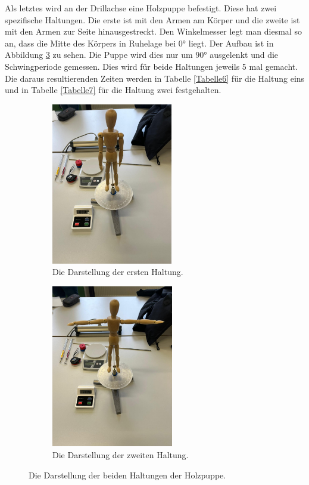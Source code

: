 \begin{flushleft}
    Als letztes wird an der Drillachse eine Holzpuppe befestigt. 
    Diese hat zwei spezifische Haltungen. 
    Die erste ist mit den Armen am Körper und die zweite ist mit den Armen zur Seite hinausgestreckt.
    Den Winkelmesser legt man diesmal so an, dass die Mitte des Körpers in Ruhelage bei $0 \unit{\degree}$ liegt.
    Der Aufbau ist in Abbildung \ref{Abbildung5} zu sehen.
    Die Puppe wird dies nur um $ 90 \unit{\degree} $ ausgelenkt und die Schwingperiode gemessen.
    Dies wird für beide Haltungen jeweils 5 mal gemacht.
    Die daraus resultierenden Zeiten werden in Tabelle \ref{Tabelle6} für die Haltung eins und in Tabelle \ref{Tabelle7} für die Haltung zwei festgehalten.  \\

    \begin{figure}
        \begin{subfigure}{0.60\textwidth}
            \centering
            \includegraphics[width=53mm]{bilder/Haltung1.jpeg}
            \caption{Die Darstellung der ersten Haltung.} 
            \label{Abbildung5a}
        \end{subfigure}
        \hfill
        \begin{subfigure}{0.60\textwidth}
            \centering
            \includegraphics[height=71mm]{bilder/Haltung2.jpeg}
            \caption{Die Darstellung der zweiten Haltung.} 
            \label{Abbildung5b}
        \end{subfigure}
        \caption{Die Darstellung der beiden Haltungen der Holzpuppe. }
        \label{Abbildung5}
    \end{figure}

\end{flushleft}

